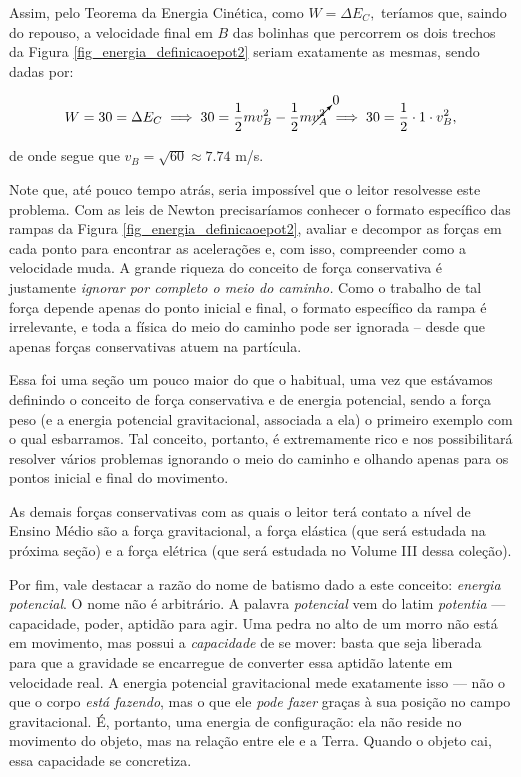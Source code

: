 Assim, pelo Teorema da Energia Cinética, como $W= \Delta E_C,$ teríamos que, saindo do repouso, a velocidade final em $B$ das bolinhas que percorrem os dois trechos da Figura \ref{fig_energia_definicaoepot2} seriam exatamente as mesmas, sendo dadas por:

$$ W = 30 = \Delta E_C \implies 30 = \dfrac{1}{2}mv_B^2 - \dfrac{1}{2}m \cancelto{0}{v_A^2} \implies 30 = \dfrac{1}{2} \cdot 1 \cdot v_B^2,$$

\noindent de onde segue que $v_B = \sqrt{60} \approx 7.74$ m/s.

Note que, até pouco tempo atrás, seria impossível que o leitor resolvesse este problema. Com as leis de Newton precisaríamos conhecer o formato específico das rampas da Figura \ref{fig_energia_definicaoepot2}, avaliar e decompor as forças em cada ponto para encontrar as acelerações e, com isso, compreender como a velocidade muda. A grande riqueza do conceito de força conservativa é justamente \emph{ignorar por completo o meio do caminho.} Como o trabalho de tal força depende apenas do ponto inicial e final, o formato específico da rampa é irrelevante, e toda a física do meio do caminho pode ser ignorada -- desde que apenas forças conservativas atuem  na partícula.

Essa foi uma seção um pouco maior do que o habitual, uma vez que estávamos definindo o conceito de força conservativa e de energia potencial, sendo a força peso (e a energia potencial gravitacional, associada a ela) o primeiro exemplo com o qual esbarramos. Tal conceito, portanto, é extremamente rico e nos possibilitará resolver vários problemas ignorando o meio do caminho e olhando apenas para os pontos inicial e final do movimento.


As demais forças conservativas com as quais o leitor terá contato a nível de Ensino Médio são a força gravitacional, a força elástica (que será estudada na próxima seção) e a força elétrica (que será estudada no Volume III dessa coleção).

Por fim, vale destacar a razão do nome de batismo dado a este conceito: \emph{energia potencial}. O nome não é arbitrário. A palavra \emph{potencial} vem do latim
\textit{potentia} --- capacidade, poder, aptidão para agir. Uma pedra
no alto de um morro não está em movimento, mas possui a \emph{capacidade}
de se mover: basta que seja liberada para que a gravidade se encarregue
de converter essa aptidão latente em velocidade real. A energia potencial
gravitacional mede exatamente isso --- não o que o corpo \emph{está
fazendo}, mas o que ele \emph{pode fazer} graças à sua posição no campo
gravitacional. É, portanto, uma energia de configuração: ela não reside
no movimento do objeto, mas na relação entre ele e a Terra. Quando o
objeto cai, essa capacidade se concretiza.

